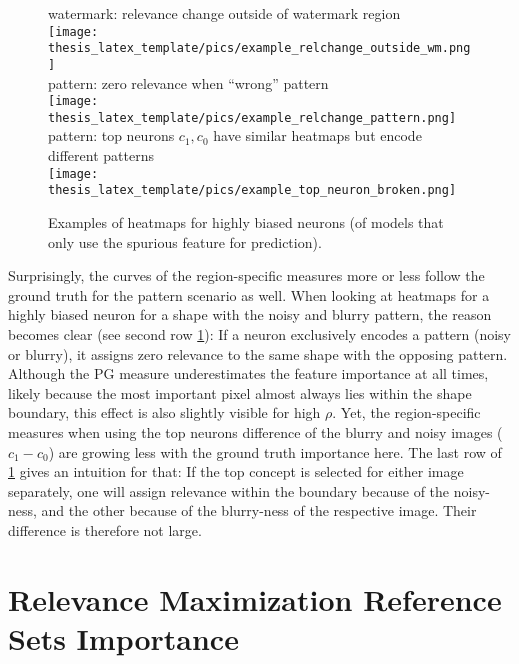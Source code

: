 \begin{figure}[t!]
    \centering
    watermark: relevance change outside of watermark region\\
    \texttt{[image: thesis\_latex\_template/pics/example\_relchange\_outside\_wm.png]}\\
    pattern: zero relevance when ``wrong'' pattern\\
    \texttt{[image: thesis\_latex\_template/pics/example\_relchange\_pattern.png]}\\
    pattern: top neurons $c_1, c_0$ have similar heatmaps but encode different patterns\\
    \texttt{[image: thesis\_latex\_template/pics/example\_top\_neuron\_broken.png]}
    \caption{Examples of heatmaps for highly biased neurons (of models that only use the spurious feature for prediction). }
    \label{fig:example_relchange_outside_wm}
\end{figure}

Surprisingly, the curves of the region-specific measures more or less follow the ground truth for the pattern scenario as well. When looking at heatmaps for a highly biased neuron for a shape with the noisy and blurry pattern, the reason becomes clear (see second row \cref{fig:example_relchange_outside_wm}): If a neuron exclusively encodes a pattern (noisy or blurry), it assigns zero relevance to the same shape with the opposing pattern. Although the PG measure underestimates the feature importance at all times, likely because the most important pixel almost always lies within the shape boundary, this effect is also slightly visible for high $\rho$. 
Yet, the region-specific measures when using the top neurons difference of the blurry and noisy images ($c_1- c_0$)  are growing less with the ground truth importance here. The last row of \cref{fig:example_relchange_outside_wm} gives an intuition for that: If the top concept is selected for either image separately, one will assign relevance within the boundary because of the noisy-ness, and the other because of the blurry-ness of the respective image. Their difference is therefore not large. 

\section{Relevance Maximization Reference Sets Importance}

